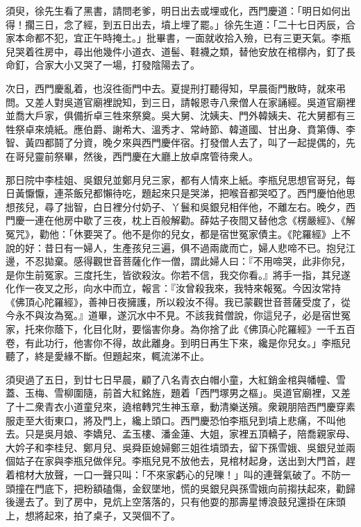 須臾，徐先生看了黑書，請問老爹，明日出去或埋或化，西門慶道：「明日如何出得！擱三日，念了經，到五日出去，墳上埋了罷。」徐先生道：「二十七日丙辰，合家本命都不犯，宜正午時掩土。」批畢書，一面就收拾入殮，已有三更天氣。李瓶兒哭着徃房中，尋出他幾件小道衣、道髻、鞋襪之類，替他安放在棺槨內，釘了長命釘，合家大小又哭了一場，打發陰陽去了。

次日，西門慶亂着，也沒徃衙門中去。夏提刑打聽得知，早晨衙門散時，就來弔問。又差人對吳道官廟裡說知，到三日，請報恩寺八衆僧人在家誦經。吳道官廟裡並喬大戶家，俱備折卓三牲來祭奠。吳大舅、沈姨夫、門外韓姨夫、花大舅都有三牲祭卓來燒紙。應伯爵、謝希大、溫秀才、常峙節、韓道國、甘出身、賁第傳、李智、黃四都鬪了分資，晚夕來與西門慶伴宿。打發僧人去了，叫了一起提偶的，先在哥兒靈前祭畢，然後，西門慶在大廳上放卓席管待衆人。

那日院中李桂姐、吳銀兒並鄭月兒三家，都有人情來上紙。李瓶兒思想官哥兒，每日黃懨懨，連茶飯兒都懶待吃，題起來只是哭涕，把喉音都哭啞了。西門慶怕他思想孩兒，尋了拙智，白日裡分付奶子、丫鬟和吳銀兒相伴他，不離左右。晚夕，西門慶一連在他房中歇了三夜，枕上百般解勸。薛姑子夜間又替他念《楞嚴經》、《解冤咒》，勸他：「休要哭了。他不是你的兒女，都是宿世冤家債主。《陀羅經》上不說的好：昔日有一婦人，生產孩兒三遍，俱不過兩歲而亡，婦人悲啼不已。抱兒江邊，不忍拋棄。感得觀世音菩薩化作一僧，謂此婦人曰：『不用啼哭，此非你兒，是你生前冤家。三度托生，皆欲殺汝。你若不信，我交你看。』將手一指，其兒遂化作一夜叉之形，向水中而立，報言：『汝曾殺我來，我特來報冤。今因汝常持《佛頂心陀羅經》，善神日夜擁護，所以殺汝不得。我已蒙觀世音菩薩受度了，從今永不與汝為冤。』道畢，遂沉水中不見。不該我貧僧說，你這兒子，必是宿世冤家，托來你蔭下，化目化財，要惱害你身。為你捨了此《佛頂心陀羅經》一千五百卷，有此功行，他害你不得，故此離身。{}到明日再生下來，纔是你兒女。」{}李瓶兒聽了，終是愛緣不斷。但題起來，輒流涕不止。

須臾過了五日，到廿七日早晨，顧了八名青衣白帽小童，大紅銷金棺與幡幢、雪蓋、玉梅、雪柳圍隨，前首大紅銘旌，題着「西門塚男之樞」。吳道官廟裡，又差了十二衆青衣小道童兒來，遶棺轉咒生神玉章，動清樂送殯。衆親朋陪西門慶穿素服走至大街東口，將及門上，纔上頭口。西門慶恐怕李瓶兒到墳上悲痛，不叫他去。只是吳月娘、李嬌兒、孟玉樓、潘金蓮、大姐，家裡五頂轎子，陪喬親家母、大妗子和李桂兒、鄭月兒、吳舜臣媳婦鄭三姐徃墳頭去，留下孫雪娥、吳銀兒並兩個姑子在家與李瓶兒做伴兒。李瓶兒見不放他去，見棺材起身，送出到大門首，趕着棺材大放聲，一口一聲只叫：「不來家虧心的兒嚛！」叫的連聲氣破了。不防一頭撞在門底下，把粉額磕傷，金釵墜地，慌的吳銀兒與孫雪娥向前搊扶起來，勸歸後邊去了。到了房中，見炕上空落落的，只有他耍的那壽星博浪鼓兒還掛在床頭上，想將起來，{}拍了桌子，又哭個不了。


